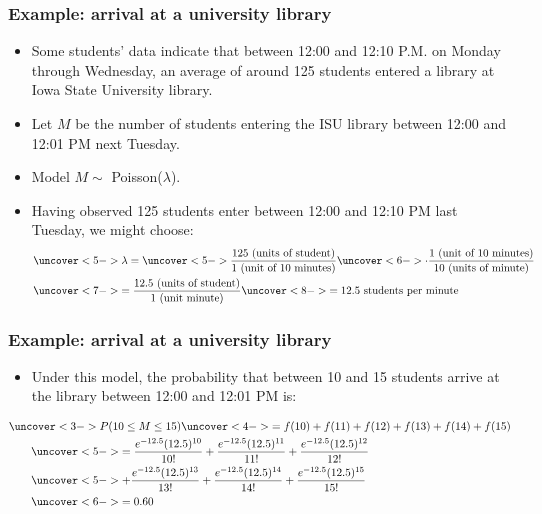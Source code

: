 \documentclass[handout]{beamer}\usepackage[]{graphicx}\usepackage[]{color}
\numberwithin{equation}{section}
\begin{document}
\begin{frame}
\frametitle{Example: arrival at a university library} \small
\begin{itemize}
\pause \item Some students' data indicate that between 12:00 and 12:10 P.M. on Monday through Wednesday, an average of around 125 students entered a library at Iowa State University library. 
\pause \item Let $M$ be the number of students entering the ISU library between 12:00 and 12:01 PM next Tuesday.
\pause \item Model $M \sim $ Poisson($\lambda$). 
\pause \item Having observed 125 students enter between 12:00 and 12:10 PM last Tuesday, we might choose:
\begin{align*}
&\uncover<5->{\lambda} = \uncover<5->{\frac{125 \text{ (units of student)}}{1 \text{ (unit of 10 minutes)}}} \uncover<6->{\cdot \frac{ \text{1 (unit of 10 minutes)}}{ \text{10 (units of minute)}}} \\
&\uncover<7->{=\frac{12.5 \text{ (units of student)}}{ \text{1 (unit minute)}}} \uncover<8->{= 12.5 \text{ students per minute}}
\end{align*}
\end{itemize}
\end{frame}

\begin{frame}
\frametitle{Example: arrival at a university library} \small
\begin{itemize}
\pause \item Under this model, the probability that between 10 and 15 students arrive at the library between 12:00 and 12:01 PM is:
\end{itemize}

\begin{align*}
&\uncover<3->{P(10 \le M \le 15)} \uncover<4->{= f(10) + f(11) + f(12) + f(13) + f(14) + f(15)} \\
& \qquad \uncover<5->{=\frac{e^{-12.5}(12.5)^{10}}{10!} + \frac{e^{-12.5}(12.5)^{11}}{11!} + \frac{e^{-12.5}(12.5)^{12}}{12!}} \\
&\qquad \uncover<5->{+\frac{e^{-12.5}(12.5)^{13}}{13!} + \frac{e^{-12.5}(12.5)^{14}}{14!} + \frac{e^{-12.5}(12.5)^{15}}{15!}} \\
&\qquad \uncover<6->{=0.60}
\end{align*}
\end{frame}
\end{document}

